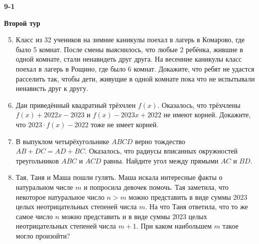 \documentclass{article}
\begin{document}
    \large

    \begin{center}
        \LARGE\textbf{9-1}
    \end{center}
    \begin{center}
        \large\textbf{Второй тур}
    \end{center}


    \begin{enumerate}[label*=9.{\arabic{enumi}}]
        \setcounter{enumi}{4}
        \item Класс из 32 учеников на зимние каникулы поехал в лагерь в Комарово, где было 5 комнат.
        После смены выяснилось, что любые 2 ребёнка, жившие в одной комнате, стали ненавидеть друг друга.
        На весенние каникулы класс поехал в лагерь в Рощино, где было 6 комнат.
        Докажите, что ребят не удастся расселить так, чтобы дети, живущие в одной комнате пока что не испытывали ненависть друг к другу.

        \item Дан приведённый квадратный трёхчлен $f(x)$.
        Оказалось, что трёхчлены $f(x) + 2022x - 2023$ и  $f(x) - 2023x + 2022$ не имеют корней.
        Докажите, что $2023\cdot f(x) - 2022$ тоже не имеет корней.

        \item В выпуклом четырёхугольнике $ABCD$ верно тождество $AB + DC = AD + BC$.
        Оказалось, что радиусы вписанных окружностей треугольников $ABC$ и $ACD$ равны.
        Найдите угол между прямыми $AC$ и $BD$.

        \item Тая, Таня и Маша пошли гулять.
        Маша искала интересные факты о натуральном числе $m$ и попросила девочек помочь.
        Тая заметила, что некоторое натуральное число $n>m$ можно представить в виде суммы 2023 целых неотрицательных степеней числа $m$.
        На что Таня ответила, что то же самое число $n$ можно представить и в виде суммы 2023 целых неотрицательных степеней числа $m + 1$.
        При каком наибольшем $m$ такое могло произойти?
    \end{enumerate}
\end{document}
